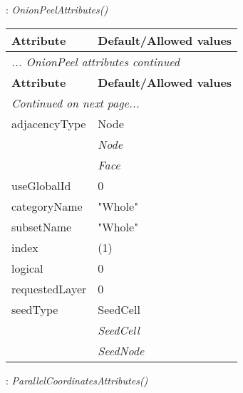 \documentclass[10pt,a4paper]{report}
\begin{document}
\newpage

{}
: {\it OnionPeelAttributes() }\\[-3mm]

\begin{longtable}{ll}
{\bf Attribute} & {\bf Default/Allowed values} \\
\hline \hline
\endfirsthead
\multicolumn{2}{l}{{\it ... OnionPeel attributes continued}} \\
{\bf Attribute} & {\bf Default/Allowed values} \\
\hline \hline
\endhead
\hline
\multicolumn{2}{l}{{\it Continued on next page...}} \\
\endfoot
\hline
\endlastfoot

adjacencyType  &  Node   \\
 & {\it  Node} \\
 & {\it  Face} \\
useGlobalId  &  0 \\
categoryName  &  "Whole" \\
subsetName  &  "Whole" \\
index  &  (1) \\
logical  &  0 \\
requestedLayer  &  0 \\
seedType  &  SeedCell   \\
 & {\it  SeedCell} \\
 & {\it  SeedNode} \\
\end{longtable}

\newpage

{}
: {\it ParallelCoordinatesAttributes() }\\[-3mm]
\end{document}
